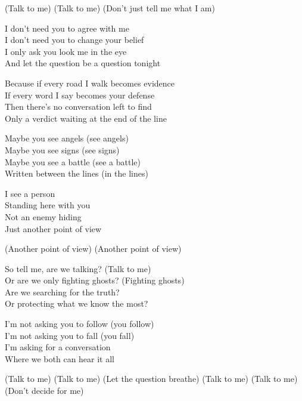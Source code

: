 \begin{lyrics}
(Talk to me)
(Talk to me)
(Don’t just tell me what I am)


I don’t need you to agree with me\\
I don’t need you to change your belief\\
I only ask you look me in the eye\\
And let the question be a question tonight

Because if every road I walk becomes evidence\\
If every word I say becomes your defense\\
Then there’s no conversation left to find\\
Only a verdict waiting at the end of the line


Maybe you see angels (see angels)\\
Maybe you see signs (see signs)\\
Maybe you see a battle (see a battle)\\
Written between the lines (in the lines)

I see a person\\
Standing here with you\\
Not an enemy hiding\\
Just another point of view

(Another point of view)
(Another point of view)


So tell me, are we talking? (Talk to me)\\
Or are we only fighting ghosts? (Fighting ghosts)\\
Are we searching for the truth?\\
Or protecting what we know the most?

I’m not asking you to follow (you follow)\\
I’m not asking you to fall (you fall)\\
I’m asking for a conversation\\
Where we both can hear it all

(Talk to me)
(Talk to me)
(Let the question breathe)
(Talk to me)
(Talk to me)
(Don’t decide for me)
\end{lyrics}

